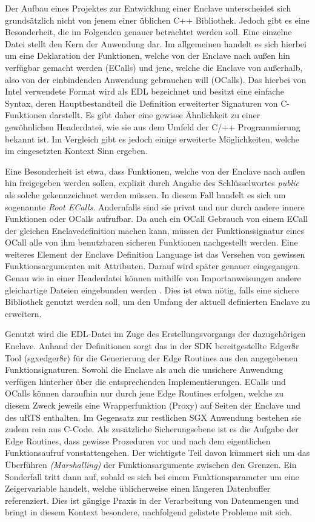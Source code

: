 Der Aufbau eines Projektes zur Entwicklung einer Enclave unterscheidet sich grundsätzlich nicht von jenem einer üblichen C++ Bibliothek. Jedoch gibt es eine Besonderheit, die im Folgenden genauer betrachtet werden soll. Eine einzelne Datei stellt den Kern der Anwendung dar. Im allgemeinen handelt es sich hierbei um eine Deklaration der Funktionen, welche von der Enclave nach außen hin verfügbar gemacht werden (\acp{ECall}) und jene, welche die Enclave von außerhalb, also von der einbindenden Anwendung gebrauchen will (\acp{OCall}). Das hierbei von Intel verwendete Format wird als \ac{EDL} bezeichnet und besitzt eine einfache Syntax, deren Hauptbestandteil die Definition erweiterter Signaturen von C-Funktionen darstellt. Es gibt daher eine gewisse Ähnlichkeit zu einer gewöhnlichen Headerdatei, wie sie aus dem Umfeld der C/++ Programmierung bekannt ist. Im Vergleich gibt es jedoch einige erweiterte Möglichkeiten, welche im eingesetzten Kontext Sinn ergeben.

Eine Besonderheit ist etwa, dass Funktionen, welche von der Enclave nach außen hin freigegeben werden sollen, explizit durch Angabe des Schlüsselwortes \textit{public} als solche gekennzeichnet werden müssen. In diesem Fall handelt es sich um sogenannte \textit{Root \acp{ECall}}. Andernfalls sind sie privat und nur durch andere innere Funktionen oder \acp{OCall} aufrufbar. Da auch ein \ac{OCall} Gebrauch von einem \ac{ECall} der gleichen Enclavedefinition machen kann, müssen der Funktionssignatur eines \ac{OCall} alle von ihm benutzbaren sicheren Funktionen nachgestellt werden. Eine weiteres Element der Enclave Definition Language ist das Versehen von gewissen Funktionsargumenten mit Attributen. Darauf wird später genauer eingegangen. Genau wie in einer Headerdatei können mithilfe von Importanweisungen andere gleichartige Dateien eingebunden werden \cite{WinDev}. Dies ist etwa nötig, falls eine sichere Bibliothek genutzt werden soll, um den Umfang der aktuell definierten Enclave zu erweitern.

Genutzt wird die \ac{EDL}-Datei im Zuge des Erstellungsvorgangs der dazugehörigen Enclave. Anhand der Definitionen sorgt das in der SDK bereitgestellte Edger8r Tool (sgx\textunderscore edger8r) für die Generierung der Edge Routines aus den angegebenen Funktionsignaturen. Sowohl die Enclave als auch die unsichere Anwendung verfügen hinterher über die entsprechenden Implementierungen. \acp{ECall} und \acp{OCall} können daraufhin nur durch jene Edge Routines erfolgen, welche zu diesem Zweck jeweils eine Wrapperfunktion (Proxy) auf Seiten der Enclave und des \ac{uRTS} enthalten. Im Gegensatz zur restlichen \ac{SGX} Anwendung bestehen sie zudem rein aus C-Code. Als zusätzliche Sicherungsebene ist es die Aufgabe der Edge Routines, dass gewisse Prozeduren vor und nach dem eigentlichen Funktionsaufruf vonstattengehen. Der wichtigste Teil davon kümmert sich um das Überführen \textit{(Marshalling)} der Funktionsargumente zwischen den Grenzen. Ein Sonderfall tritt dann auf, sobald es sich bei einem Funktionsparameter um eine Zeigervariable handelt, welche üblicherweise einen längeren Datenbuffer referenziert. Dies ist gängige Praxis in der Verarbeitung von Datenmengen und bringt in diesem Kontext besondere, nachfolgend gelistete Probleme mit sich.

